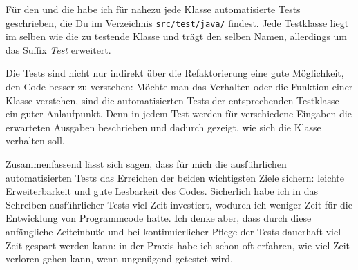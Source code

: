 Für den \md{} und die \mdg{} habe ich für nahezu jede Klasse automatisierte Tests geschrieben, die Du im Verzeichnis \texttt{src/test/java/} findest. Jede Testklasse liegt im selben \package{} wie die zu testende Klasse und trägt den selben Namen, allerdings um das Suffix \emph{Test} erweitert.

Die Tests sind nicht nur indirekt über die Refaktorierung eine gute Möglichkeit, den Code besser zu verstehen: Möchte man das Verhalten oder die Funktion einer Klasse verstehen, sind die automatisierten Tests der entsprechenden Testklasse ein guter Anlaufpunkt. Denn in jedem Test werden für verschiedene Eingaben die erwarteten Ausgaben beschrieben und dadurch gezeigt, wie sich die Klasse verhalten soll.

Zusammenfassend lässt sich sagen, dass für mich die ausführlichen automatisierten Tests das Erreichen der beiden wichtigsten Ziele sichern: leichte Erweiterbarkeit und gute Lesbarkeit des Codes. Sicherlich habe ich in das Schreiben ausführlicher Tests viel Zeit investiert, wodurch ich weniger Zeit für die Entwicklung von Programmcode hatte. Ich denke aber, dass durch diese anfängliche Zeiteinbuße und bei kontinuierlicher Pflege der Tests dauerhaft viel Zeit gespart werden kann: in der Praxis habe ich schon oft erfahren, wie viel Zeit verloren gehen kann, wenn ungenügend getestet wird.